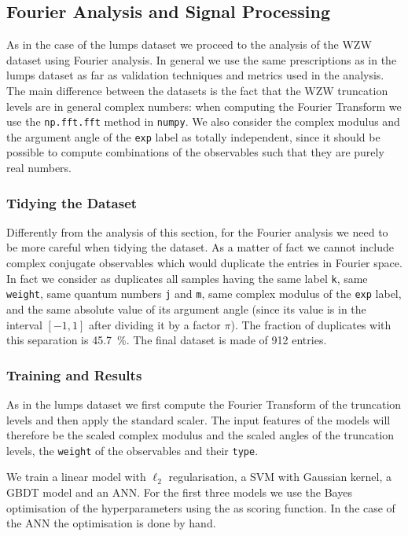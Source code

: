 \subsection{Fourier Analysis and Signal Processing}

As in the case of the lumps dataset we proceed to the analysis of the WZW dataset using Fourier analysis.
In general we use the same prescriptions as in the lumps dataset as far as validation techniques and metrics used in the analysis.
The main difference between the datasets is the fact that the WZW truncation levels are in general complex numbers: when computing the Fourier Transform we use the \texttt{np.fft.fft} method in \texttt{numpy}.
We also consider the complex modulus and the argument angle of the \texttt{exp} label as totally independent, since it should be possible to compute combinations of the observables such that they are purely real numbers.


\subsubsection{Tidying the Dataset}

Differently from the analysis of this section, for the Fourier analysis we need to be more careful when tidying the dataset.
As a matter of fact we cannot include complex conjugate observables which would duplicate the entries in Fourier space.
In fact we consider as duplicates all samples having the same label \texttt{k}, same \texttt{weight}, same  quantum numbers \texttt{j} and \texttt{m}, same complex modulus of the \texttt{exp} label, and the same absolute value of its argument angle (since its value is in the interval $[-1, 1]$ after dividing it by a factor $\pi$).
The fraction of duplicates with this separation is \SI{45.7}{\percent}.
The final dataset is made of \num{912} entries.


\subsubsection{Training and Results}

As in the lumps dataset we first compute the Fourier Transform of the truncation levels and then apply the standard scaler.
The input features of the \ml models will therefore be the scaled complex modulus and the scaled angles of the truncation levels, the \texttt{weight} of the observables and their \texttt{type}.

We train a linear model with $\ell_2$ regularisation, a SVM with Gaussian kernel, a GBDT model and an ANN.
For the first three models we use the Bayes optimisation of the hyperparameters using the \mse as scoring function.
In the case of the ANN the optimisation is done by hand.

